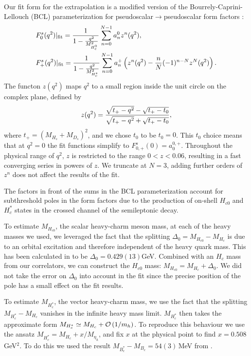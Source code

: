 Our fit form for the extrapolation is a modified version of the Bourrely-Caprini-Lellouch (BCL) parameterization for pseudoscalar$\to$pseudoscalar form factors \cite{Bourrely:2008za}:
\begin{align}
  \label{eq:BCL}
  &F^s_0(q^2)|_{\text{fit}} = {1\over 1 - {q^2\over M_{H_c^0}^2} } \sum_{n=0}^{N-1} a_n^0 z^n(q^2), \\
  &F^s_+(q^2)|_{\text{fit}} = {1\over 1 - {q^2\over M_{H_c^*}^2} } \sum_{n=0}^{N-1} a_n^+ \left( z^n(q^2) - {n\over N} (-1)^{n-N} z^N(q^2) \right). \nonumber
\end{align}
The functon $z(q^2)$ maps $q^2$ to a small region inside the unit circle on the complex plane, defined by
\begin{align}
  z(q^2) = {\sqrt{t_+ - q^2} - \sqrt{t_+ - t_0} \over \sqrt{t_+ - q^2} + \sqrt{t_+ - t_0} },
\end{align}
where $t_+ = (M_{H_s}+M_{D_s})^2$, and we chose $t_0$ to be $t_0 = 0$. This $t_0$ choice means that at $q^2=0$ the fit functions simplify to $F_{0,+}^s(0) = a_0^{0,+}$. Throughout the physical range of $q^2$, $z$ is restricted to the range $0<z<0.06$, resulting in a fast converging series in powers of $z$. We truncate at $N=3$, adding further orders of $z^n$ does not affect the results of the fit.

The factors in front of the sums in the BCL parameterization account for subthreshold poles in the form factors due to the production of on-shell $H_{c0}$ and $H_c^*$ states in the crossed channel of the semileptonic decay.

To estimate $M_{H_{c0}}$, the scalar heavy-charm meson mass, at each of the heavy masses we used, we leveraged the fact that the splitting $\Delta_0 = M_{H_{c0}} - M_{H_c}$ is due to an orbital excitation and therefore independent of the heavy quark mass. This has been calculated in \cite{Dowdall:2012ab} to be $\Delta_0 = 0.429(13)$GeV. Combined with an $H_c$ mass from our correlators, we can construct the $H_{c0}$ mass: $M_{H_{c0}} = M_{H_c} + \Delta_0$. We did not take the error on $\Delta_0$ into account in the fit since the precise position of the pole has a small effect on the fit results.

To estimate $M_{H^*_c}$, the vector heavy-charm mass, we use the fact that the splitting $ M_{H_c^*} - M_{H_c}$ vanishes in the infinite heavy mass limit. $M_{H_c^*}$ then takes the approximate form $M_{H_c^*} \simeq M_{H_c} + \mathcal{O}\left( 1/m_h \right)$. To reproduce this behaviour we use the ansatz $M_{H_c^*} = M_{H_c} + x/M_{\eta_h}$, and fix $x$ at the physical point to find $x=0.508$GeV$^2$. To do this we used the result $M_{B_c^*}-M_{B_c}=54(3)\,$MeV from \cite{Dowdall:2012ab}.

